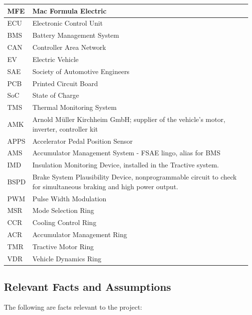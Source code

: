 \documentclass[12pt]{article}
\newcommand{\ReqColA}{0.13\textwidth}
\newcommand{\ReqColB}{0.82\textwidth}
\begin{document}
\noindent
\begin{tabular}{| p{\ReqColA} | p{\ReqColB}|}
\hline
\rowcolor[gray]{0.9}
MFE & Mac Formula Electric \\
\hline
ECU & Electronic Control Unit \\
\hline
\rowcolor[gray]{0.9}
BMS & Battery Management System \\
\hline
CAN & Controller Area Network \\
\hline
\rowcolor[gray]{0.9}
EV & Electric Vehicle \\
\hline
SAE & Society of Automotive Engineers \\
\hline
\rowcolor[gray]{0.9}
PCB & Printed Circuit Board \\
\hline
SoC & State of Charge \\
\hline
\rowcolor[gray]{0.9}
TMS & Thermal Monitoring System \\
\hline
AMK & Arnold Müller Kirchheim GmbH; supplier of the vehicle's motor, inverter, 
controller kit \\
\hline
\rowcolor[gray]{0.9}
APPS & Accelerator Pedal Position Sensor \\
\hline
AMS & Accumulator Management System - FSAE lingo, alias for BMS\\
\hline
\rowcolor[gray]{0.9}
IMD & Insulation Monitoring Device, installed in the Tractive system.\\
\hline
BSPD & Brake System Plausibility Device, nonprogrammable circuit to check for simultaneous braking and high power output.\\
\hline
\rowcolor[gray]{0.9}
PWM & Pulse Width Modulation \\
\hline
MSR & Mode Selection Ring \\
\hline
\rowcolor[gray]{0.9}
CCR & Cooling Control Ring \\
\hline
ACR & Accumulator Management Ring \\
\hline
\rowcolor[gray]{0.9}
TMR & Tractive Motor Ring \\
\hline
VDR & Vehicle Dynamics Ring \\
\hline

\end{tabular}

\subsection{Relevant Facts and Assumptions}

The following are facts relevant to the project:
\end{document}
